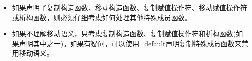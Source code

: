 \begin{itemize}
	\item 如果声明了复制构造函数、移动构造函数、复制赋值操作符、移动赋值操作符或析构函数，则必须仔细考虑如何处理其他特殊成员函数。
	\item 如果不理解移动语义，只考虑复制构造函数、复制赋值操作符和析构函数(如果声明其中之一)。如果有疑问，可以使用=default声明复制特殊成员函数来禁用移动语义。
\end{itemize}






















































